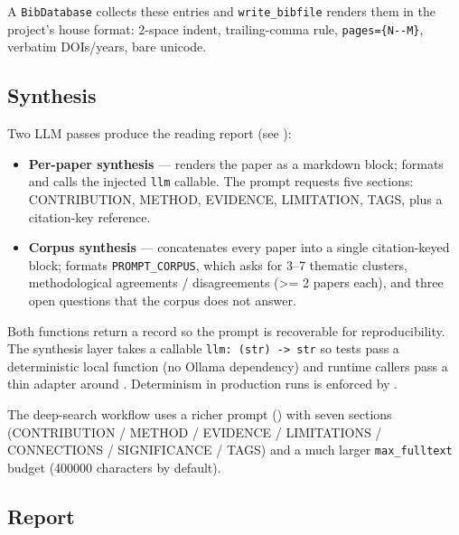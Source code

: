 \documentclass[
  english,
]{article}
\providecommand{\tightlist}{%
  \setlength{\itemsep}{0pt}\setlength{\parskip}{0pt}}
\begin{document}
A \texttt{BibDatabase} collects these entries and
\texttt{write\_bibfile} renders them in the project's house format:
2-space indent, trailing-comma rule, \texttt{pages=\{N-\/-M\}}, verbatim
DOIs/years, bare unicode.

\subsection{Synthesis}\label{synthesis}

Two LLM passes produce the reading report (see
):

\begin{itemize}
\tightlist
\item
  \textbf{Per-paper synthesis} ---
  renders the paper as a markdown block; 
  formats  and calls the injected
  \texttt{llm} callable. The prompt requests five sections:
  CONTRIBUTION, METHOD, EVIDENCE, LIMITATION, TAGS, plus a citation-key
  reference.
\item
  \textbf{Corpus synthesis} --- 
  concatenates every paper into a single citation-keyed block;
   formats \texttt{PROMPT\_CORPUS}, which
  asks for 3--7 thematic clusters, methodological agreements /
  disagreements (\texorpdfstring{\textgreater{}=}{>=} 2 papers each), and three open questions that the
  corpus does not answer.
\end{itemize}

Both functions return a
 record so the
prompt is recoverable for reproducibility. The synthesis layer takes a
callable \texttt{llm:\ (str)\ -\textgreater{}\ str} so tests pass a
deterministic local function (no Ollama dependency) and runtime callers
pass a thin adapter around .
Determinism in production runs is enforced by
.

The deep-search workflow uses a richer prompt
() with seven sections
(CONTRIBUTION / METHOD / EVIDENCE / LIMITATIONS / CONNECTIONS /
SIGNIFICANCE / TAGS) and a much larger \texttt{max\_fulltext} budget
(400000 characters by default).

\subsection{Report}\label{report}
\end{document}
